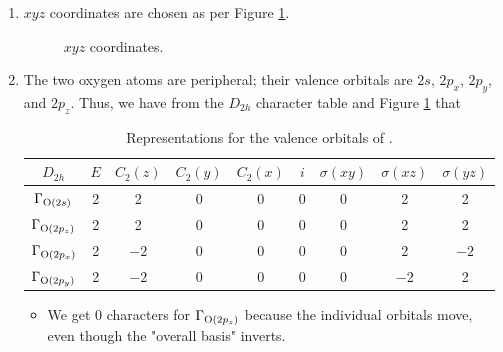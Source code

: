 \documentclass[../notes.tex]{subfiles}
\begin{document}
\begin{itemize}
\begin{enumerate}
\begin{table}[h!]
            \caption{$D_{2h}$ character table.}
            \label{tab:charTableD2h}
        \end{table}
        \item $xyz$ coordinates are chosen as per Figure \ref{fig:CO2xyz}.
        \begin{figure}[h!]
            \centering
            \footnotesize
            \caption{ $xyz$ coordinates.}
            \label{fig:CO2xyz}
        \end{figure}
        \item The two oxygen atoms are peripheral; their valence orbitals are $2s$, $2p_x$, $2p_y$, and $2p_z$. Thus, we have from the $D_{2h}$ character table and Figure \ref{fig:CO2xyz} that
        \begin{table}[h!]
            \centering
            \small
            \renewcommand{\arraystretch}{1.2}
            \begin{tabular}{c|cccccccc}
                $D_{2h}$ & $E$ & $C_2(z)$ & $C_2(y)$ & $C_2(x)$ & $i$ & $\sigma(xy)$ & $\sigma(xz)$ & $\sigma(yz)$\\
                \hline
                $\Gamma_{\ce{O}(2s)}$ & 2 & 2 & 0 & 0 & 0 & 0 & 2 & 2\\
                $\Gamma_{\ce{O}(2p_z)}$ & 2 & 2 & 0 & 0 & 0 & 0 & 2 & 2\\
                $\Gamma_{\ce{O}(2p_x)}$ & 2 & $-2$ & 0 & 0 & 0 & 0 & 2 & $-2$\\
                $\Gamma_{\ce{O}(2p_y)}$ & 2 & $-2$ & 0 & 0 & 0 & 0 & $-2$ & 2\\
            \end{tabular}
            \caption{Representations for the valence orbitals of .}
            \label{tab:CO2RR}
        \end{table}
        \begin{itemize}
            \item We get 0 characters for $\Gamma_{\ce{O}(2p_z)}$ because the individual orbitals move, even though the "overall basis" inverts.

\end{itemize}
\end{enumerate}
\end{itemize}
\end{document}
